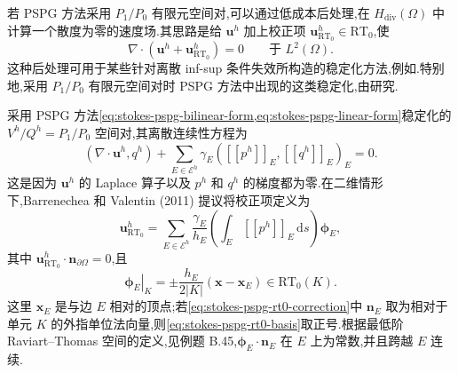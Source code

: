 \begin{note}\label{note:stokes-pspg-postprocessed-velocity}
若 PSPG 方法采用 $P_1/P_0$ 有限元空间对,可以通过低成本后处理,在 $H_{\mathrm{div}}(\Omega)$ 中计算一个散度为零的速度场.其思路是给 $\bm{u}^h$ 加上校正项 $\bm{u}_{\mathrm{RT}_0}^h\in\mathrm{RT}_0$,使
\[
 \nabla\cdot(\bm{u}^h+\bm{u}_{\mathrm{RT}_0}^h)=0
 \qquad\text{于 }L^2(\Omega).
\]
这种后处理可用于某些针对离散 inf-sup 条件失效所构造的稳定化方法,例如\textcite{BarrenecheaValentin2010a,BarrenecheaValentin2010b,BarrenecheaValentin2011}.特别地,采用 $P_1/P_0$ 有限元空间对时 PSPG 方法中出现的这类稳定化,由\textcite{BarrenecheaValentin2011}研究.

采用 PSPG 方法\cref{eq:stokes-pspg-bilinear-form,eq:stokes-pspg-linear-form}稳定化的 $V^h/Q^h=P_1/P_0$ 空间对,其离散连续性方程为
\begin{equation}\label{eq:stokes-pspg-p1p0-continuity}
 (\nabla\cdot\bm{u}^h,q^h)
 +\sum_{E\in\mathcal{E}^h}\gamma_E
    ([[p^h]]_E,[[q^h]]_E)_E=0.
\end{equation}
这是因为 $\bm{u}^h$ 的 Laplace 算子以及 $p^h$ 和 $q^h$ 的梯度都为零.在二维情形下,Barrenechea 和 Valentin (2011) 提议将校正项定义为
\begin{equation}\label{eq:stokes-pspg-rt0-correction}
 \bm{u}_{\mathrm{RT}_0}^h
 =\sum_{E\in\mathcal{E}^h}\frac{\gamma_E}{h_E}
     \left(\int_E[[p^h]]_E\,\mathrm{d}s\right)\symbf{\phi}_E,
\end{equation}
其中 $\bm{u}_{\mathrm{RT}_0}^h\cdot\bm{n}_{\partial\Omega}=0$,且
\begin{equation}\label{eq:stokes-pspg-rt0-basis}
 \left.\symbf{\phi}_E\right|_K
 =\pm\frac{h_E}{2|K|}(\bm{x}-\bm{x}_E)
 \in\mathrm{RT}_0(K).
\end{equation}
这里 $\bm{x}_E$ 是与边 $E$ 相对的顶点;若\cref{eq:stokes-pspg-rt0-correction}中 $\bm{n}_E$ 取为相对于单元 $K$ 的外指单位法向量,则\cref{eq:stokes-pspg-rt0-basis}取正号.根据最低阶 Raviart--Thomas 空间的定义,见例题 B.45,$\symbf{\phi}_E\cdot\bm{n}_E$ 在 $E$ 上为常数,并且跨越 $E$ 连续.


\end{note}
